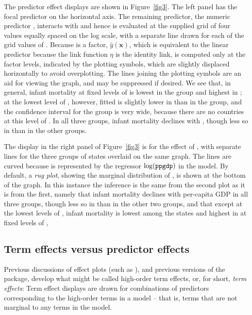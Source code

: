 \documentclass[article]{jss}
\newcommand{\x}{\mathbf{x}}
\newcommand{\yx}{\widehat{y}(\x)}
\newcommand{\lvn}[1]{\mbox{$\log(\mbox{\texttt{#1}})$}}
\begin{document}
The predictor effect displays are shown in Figure~\ref{fig3}.  The left panel has the focal predictor  on the horizontal axis.  The remaining predictor, the numeric predictor , interacts with  and hence is evaluated at the supplied grid of four values equally spaced on the log scale, with a separate line drawn for each of the grid values of .  Because  is a factor, $\yx{}$, which is equivalent to the linear predictor because the link function $\eta$ is the identity link, is computed only at the factor levels, indicated by the plotting symbols, which are slightly displaced horizontally to avoid overplotting.  The lines joining the plotting symbols are an aid for viewing the graph, and may be suppressed if desired.  We see that, in general, infant mortality at fixed levels of  is lowest in the  group and highest in ; at the lowest level of , however, fitted  is slightly lower in  than in the  group, and the confidence interval for the  group is very wide, because there are no  countries at this level of . In all three groups, infant mortality declines with , though less so in  than in the other groups.

The display in the right panel of Figure~\ref{fig3} is for the effect of , with separate lines for the three groups of states overlaid on the same graph.  The lines are curved because  is represented by the regressor $\lvn{ppgdp}$ in the model. By default, a \emph{rug plot}, showing the marginal distribution of , is shown at the bottom of the graph.  In this instance the inference is the same from the second plot as it is from the first, namely that infant mortality declines with per-capita GDP in all three groups, though less so in  than in the other two groups, and that except at the lowest levels of , infant mortality is lowest among the  states and highest in  at fixed levels of ,

\subsection{Term effects versus predictor effects}

Previous discussions of effect plots (such as \citealp{Fox87}), and previous versions of the  package, develop what might be called high-order term effects, or, for short, \emph{term effects}: Term effect displays are drawn for combinations of predictors corresponding to the high-order terms in a model -- that is, terms that are not marginal to any terms in the model.
\end{document}
